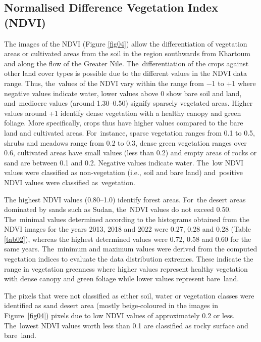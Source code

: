 \documentclass[jimaging,article,accept,pdftex,moreauthors]{Definitions/mdpi}
\begin{document}
\subsection{Normalised Difference Vegetation Index (NDVI)}
The images of the NDVI (Figure \ref{fig04}) allow the differentiation of vegetation areas or cultivated areas from the soil in the region southwards from Khartoum and along the flow of the Greater Nile. The~differentiation of the crops against other land cover types is possible due to the different values in the NDVI data range. Thus, the~values of the NDVI vary within the range from $-$1 to +1 where negative values indicate water, lower values above 0 show bare soil and land, and~mediocre values (around 1.30--0.50) signify sparsely vegetated areas. Higher values around +1 identify dense vegetation with a healthy canopy and green foliage. More specifically, crops thus have higher values compared to the bare land and cultivated areas. For~instance, sparse vegetation ranges from 0.1 to 0.5, shrubs and meadows range from 0.2 to 0.3, dense green vegetation ranges over 0.6, cultivated areas have small values (less than 0.2) and empty areas of rocks or sand are between 0.1 and 0.2. Negative values indicate water. The~low NDVI values were classified as non-vegetation (i.e., soil and bare land) and~positive NDVI values were classified as~vegetation. 



The highest NDVI values (0.80--1.0) identify forest areas. For~the desert areas dominated by sands such as Sudan, the~NDVI values do not exceed 0.50. The~minimal values determined according to the histograms obtained from the NDVI images for the years 2013, 2018 and 2022 were 0.27, 0.28 and 0.28 (Table \ref{tab02}), whereas the highest determined values were 0.72, 0.58 and 0.60 for the same years. The~minimum and maximum values were derived from the computed vegetation indices to evaluate the data distribution extremes. These indicate the range in vegetation greenness where higher values represent healthy vegetation with dense canopy and green foliage while lower values represent  bare~land. 

The pixels that were not classified as either soil, water or vegetation classes were identified as sand desert area (mostly beige-coloured in the images in Figure~\ref{fig04}) pixels due to low NDVI values of approximately 0.2 or less. The~lowest NDVI values worth less than 0.1 are classified as rocky surface and bare~land. 
\end{document}
